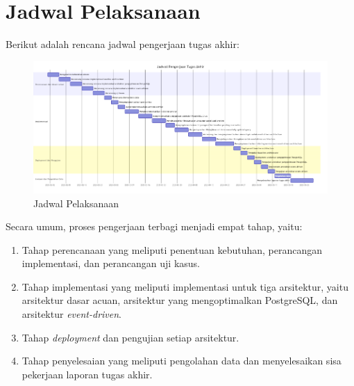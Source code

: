 \section{Jadwal Pelaksanaan}

Berikut adalah rencana jadwal pengerjaan tugas akhir:

\begin{figure}[ht]
    \centering
    \includegraphics[width=1\textwidth]{resources/schedule/schedule.png}
    \caption{Jadwal Pelaksanaan}
    \label{fig:jadwal pelaksanaan}
\end{figure}

Secara umum, proses pengerjaan terbagi menjadi empat tahap, yaitu:

\begin{enumerate}
    \item Tahap perencanaan yang meliputi penentuan kebutuhan, perancangan implementasi, dan perancangan uji kasus.
    \item Tahap implementasi yang meliputi implementasi untuk tiga arsitektur, yaitu arsitektur dasar acuan, arsitektur yang mengoptimalkan PostgreSQL, dan arsitektur \textit{event-driven}.
    \item Tahap \textit{deployment} dan pengujian setiap arsitektur.
    \item Tahap penyelesaian yang meliputi pengolahan data dan menyelesaikan sisa pekerjaan laporan tugas akhir.
\end{enumerate}